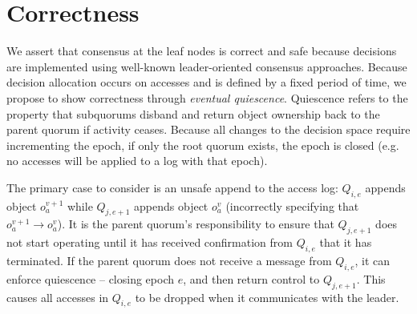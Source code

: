 \documentclass[11pt,letterpaper]{article}
\begin{document}
\section{Correctness}


We assert that consensus at the leaf nodes is correct and safe because decisions are
implemented using well-known leader-oriented consensus approaches.
Because decision allocation occurs on accesses and is defined by a fixed period of time,
we propose to show correctness through \emph{eventual quiescence}.
Quiescence refers to the property that subquorums disband and return object ownership
back to the parent quorum if activity ceases.
Because all changes to the decision space require incrementing the epoch, if only the
root quorum exists, the epoch is closed (e.g. no accesses will be applied to a log with
that epoch).

The primary case to consider is an unsafe append to the access log: $Q_{i,e}$
appends object $o_a^{v+1}$ while $Q_{j,e+1}$ appends object $o_a^v$ (incorrectly
specifying that $o_a^{v+1} \rightarrow o_a^v$).
It is the parent quorum's responsibility to ensure that $Q_{j,e+1}$ does not start
operating until it has received confirmation from $Q_{i,e}$ that it has terminated.
If the parent quorum does not receive a message from $Q_{i,e}$, it can enforce quiescence
-- closing epoch $e$, and then return control to $Q_{j,e+1}$. This causes all accesses in
$Q_{i,e}$ to be dropped when it communicates with the leader.
\end{document}

